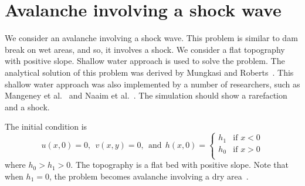 
\section{Avalanche involving a shock wave}

We consider an avalanche involving a shock wave.
This problem is similar to dam break on wet areas, and so, it involves a shock. We consider a flat topography with positive slope. Shallow water approach is used to solve the problem. The analytical solution of this problem was derived by Mungkasi and Roberts~\cite{MR2012PAAG}. This shallow water approach was also implemented by a number of researchers, such as Mangeney et al.~\cite{MHR2000} and Naaim et al.~\cite{NVC1997}. The simulation should show a rarefaction and a shock. 



The initial condition is
\begin{equation} \label{eq:dap_init}
u(x,0)=0, ~~v(x,y)=0, ~~\textrm{and}~~
h(x,0) = \left\{ \begin{array}{ll}
h_1 & \textrm{if $x < 0$}\\
h_0 & \textrm{if $x > 0$}\\
\end{array} \right.
\end{equation}
where $h_0>h_1>0$. The topography is a flat bed with positive slope. Note that when $h_1=0$, the problem becomes avalanche involving a dry area~\cite{MR2011DA}.

